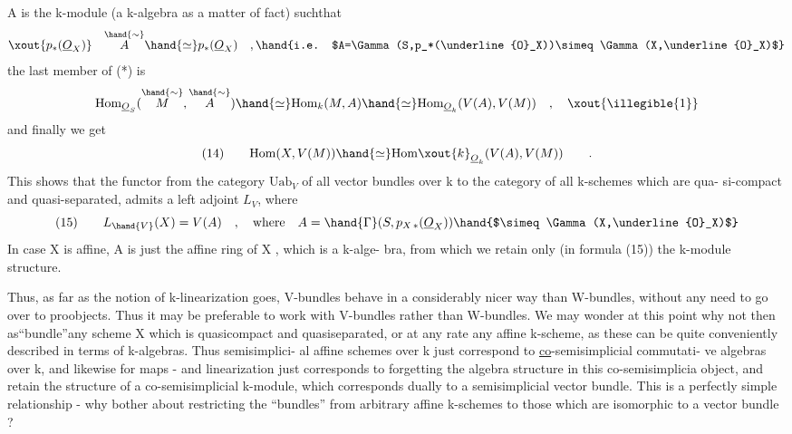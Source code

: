 
A is the  k-module (a k-algebra as a matter of fact) suchthat
\[ \xout{p_*(\underline{O}_X)} \quad \overset{\hand{\sim}}{A} \hand{\simeq} p_*(\underline{O}_X) \quad , \hand{i.e. $A=\Gamma(S,p_*(\underline{O}_X))\simeq\Gamma(X,\underline{O}_X)$} \]
the last member of (*) is
\[ \mathrm{Hom}_{\underline{O}_S}(\overset{\hand{\sim}}{M} , \overset{\hand{\sim}}{A}) \hand{\simeq} \mathrm{Hom}_k(M,A) \hand{\simeq} \mathrm{Hom}_{\underline{O}_k}(V(A), V(M)) \quad , \quad \xout{\illegible{1}} \]
and finally we get
\[ (14) \qquad \mathrm{Hom}(X,V(M)) \hand{\simeq} \mathrm{Hom}\xout{k}_{\underline{O}_k}(V(A),V(M)) \qquad . \]
This shows that the  functor from the category $\mathrm{Uab}_V$ of all
vector bundles over k to the category of all  k-schemes which are qua-%
si-compact and quasi-separated, admits a left adjoint $L_V$, where
\[ (15) \qquad L_{\hand{V}}(X) = V(A) \quad , \quad \text{where} \quad A = \hand{\Gamma}(S, p_{X\,*}(\underline{O}_X)) \hand{$\simeq \Gamma(X,\underline{O}_X)$} \]
In case X is affine, A is just the affine ring of X , which is a k-alge-%
bra, from which we retain only (in formula (15)) the k-module structure.

Thus, as far as the notion of k-linearization goes, V-bundles
behave in a considerably nicer way than W-bundles, without any need to
go over to proobjects.  Thus it may be preferable to
work with V-bundles rather than W-bundles. We may wonder at this point
why not  then as``bundle''any scheme X which is quasicompact and
quasiseparated, or at any rate any affine k-scheme, as these can be
quite conveniently described in terms of k-algebras. Thus\hand{,} semisimplici-%
al affine schemes over k just correspond to \uline{co}-semisimplicial commutati-%
ve algebras over k, and likewise for maps - and linearization just
corresponds to forgetting the algebra structure in this co-semisimplicia
object, and retain the structure of a co-semisimplicial k-module,
which corresponds dually to a semisimplicial vector bundle. This is
a perfectly simple relationship - why bother about restricting the
``bundles'' from arbitrary affine k-schemes to those which are isomorphic
to a vector bundle ?

